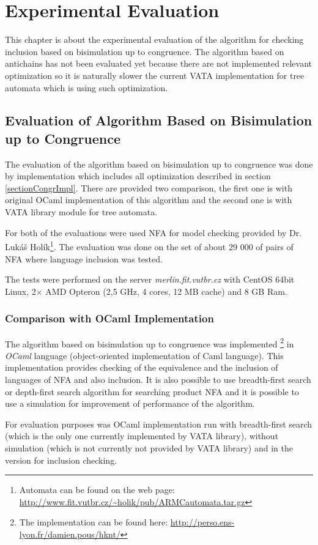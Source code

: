 \chapter{Experimental Evaluation}
\label{eval}
This chapter is about the experimental evaluation of the algorithm for checking inclusion based on bisimulation up to congruence. The algorithm based on antichains
has not been evaluated yet because there are not implemented relevant optimization so it is naturally slower the current VATA implementation for tree automata
which is using such optimization.

\section{Evaluation of Algorithm Based on Bisimulation up to Congruence}
The evaluation of the algorithm based on bisimulation up to congruence was done by implementation which includes all optimization described in section 
\ref{sectionCongrImpl}. There are provided two comparison, the first one is with original OCaml implementation of this algorithm and the second one is with
VATA library module for tree automata.

For both of the evaluations were used NFA for model checking provided by Dr. Lukáš Holík\footnote{
Automata can be found on the web page: \url{http://www.fit.vutbr.cz/~holik/pub/ARMCautomata.tar.gz}}.  
The evaluation was done on the set of about 29 000 of pairs of NFA where language inclusion was tested. 

The tests were performed on the server \emph{merlin.fit.vutbr.cz} with CentOS 64bit Linux, 2$\times$ AMD Opteron (2,5 GHz, 4 cores, 12 MB cache) and 8 GB Ram.
\subsection{Comparison with OCaml Implementation}
The algorithm based on bisimulation up to congruence was implemented 
\footnote{The implementation can be found here: \url{http://perso.ens-lyon.fr/damien.pous/hknt/}} 
in \emph{OCaml} language (object-oriented implementation of Caml language). 
This implementation provides checking of the equivalence
and the inclusion of languages of NFA and also inclusion. It is also possible to use breadth-first search or depth-first search algorithm for searching 
product NFA and it is possible to use a simulation for improvement of performance of the algorithm.

For evaluation purposes was OCaml implementation run with breadth-first search (which is the only one currently implemented by VATA library), without
simulation (which is not currently not provided by VATA library) and in the version for inclusion checking.

